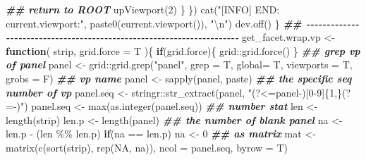 \documentclass[
]{article}
\newenvironment{Shaded}{\begin{snugshade}}{\end{snugshade}}
\newcommand{\AttributeTok}[1]{\textcolor[rgb]{0.77,0.63,0.00}{#1}}
\newcommand{\ConstantTok}[1]{\textcolor[rgb]{0.00,0.00,0.00}{#1}}
\newcommand{\ControlFlowTok}[1]{\textcolor[rgb]{0.13,0.29,0.53}{\textbf{#1}}}
\newcommand{\DecValTok}[1]{\textcolor[rgb]{0.00,0.00,0.81}{#1}}
\newcommand{\DocumentationTok}[1]{\textcolor[rgb]{0.56,0.35,0.01}{\textbf{\textit{#1}}}}
\newcommand{\FunctionTok}[1]{\textcolor[rgb]{0.00,0.00,0.00}{#1}}
\newcommand{\NormalTok}[1]{#1}
\newcommand{\OtherTok}[1]{\textcolor[rgb]{0.56,0.35,0.01}{#1}}
\newcommand{\SpecialCharTok}[1]{\textcolor[rgb]{0.00,0.00,0.00}{#1}}
\newcommand{\StringTok}[1]{\textcolor[rgb]{0.31,0.60,0.02}{#1}}
\begin{document}
\begin{Shaded}
\begin{Highlighting}[]
              \DocumentationTok{\#\# return to ROOT}
              \FunctionTok{upViewport}\NormalTok{(}\DecValTok{2}\NormalTok{)}
\NormalTok{            \}}
\NormalTok{            \})}
    \FunctionTok{cat}\NormalTok{(}\StringTok{"[INFO] END: current.viewport:"}\NormalTok{, }\FunctionTok{paste0}\NormalTok{(}\FunctionTok{current.viewport}\NormalTok{()), }\StringTok{"}\SpecialCharTok{\textbackslash{}n}\StringTok{"}\NormalTok{)}
    \FunctionTok{dev.off}\NormalTok{()}
\NormalTok{  \}}
\DocumentationTok{\#\# {-}{-}{-}{-}{-}{-}{-}{-}{-}{-}{-}{-}{-}{-}{-}{-}{-}{-}{-}{-}{-}{-}{-}{-}{-}{-}{-}{-}{-}{-}{-}{-}{-}{-}{-}{-}{-}{-}{-}{-}{-}{-}{-}{-}{-}{-}{-}{-}{-}{-}{-}{-}{-}{-}{-}{-}{-}{-}{-}{-}{-}{-}{-}{-}{-}{-}{-}{-}{-}{-} }
\NormalTok{get\_facet.wrap.vp }\OtherTok{\textless{}{-}}
  \ControlFlowTok{function}\NormalTok{(}
\NormalTok{           strip,}
           \AttributeTok{grid.force =}\NormalTok{ T}
\NormalTok{           )\{}
    \ControlFlowTok{if}\NormalTok{(grid.force)\{}
\NormalTok{      grid}\SpecialCharTok{::}\FunctionTok{grid.force}\NormalTok{()}
\NormalTok{    \}}
    \DocumentationTok{\#\# grep vp of panel}
\NormalTok{    panel }\OtherTok{\textless{}{-}}\NormalTok{ grid}\SpecialCharTok{::}\FunctionTok{grid.grep}\NormalTok{(}\StringTok{"panel"}\NormalTok{, }\AttributeTok{grep =}\NormalTok{ T, }\AttributeTok{global=}\NormalTok{ T, }\AttributeTok{viewports =}\NormalTok{ T, }\AttributeTok{grobs =}\NormalTok{ F)}
    \DocumentationTok{\#\# vp name}
\NormalTok{    panel }\OtherTok{\textless{}{-}} \FunctionTok{sapply}\NormalTok{(panel, paste)}
    \DocumentationTok{\#\# the specific seq number of vp}
\NormalTok{    panel.seq }\OtherTok{\textless{}{-}}\NormalTok{ stringr}\SpecialCharTok{::}\FunctionTok{str\_extract}\NormalTok{(panel, }\StringTok{"(?\textless{}=panel{-})[0{-}9]\{1,\}(?={-})"}\NormalTok{)}
\NormalTok{    panel.seq }\OtherTok{\textless{}{-}} \FunctionTok{max}\NormalTok{(}\FunctionTok{as.integer}\NormalTok{(panel.seq))}
    \DocumentationTok{\#\# number stat}
\NormalTok{    len }\OtherTok{\textless{}{-}} \FunctionTok{length}\NormalTok{(strip)}
\NormalTok{    len.p }\OtherTok{\textless{}{-}} \FunctionTok{length}\NormalTok{(panel)}
    \DocumentationTok{\#\# the number of blank panel}
\NormalTok{    na }\OtherTok{\textless{}{-}}\NormalTok{ len.p }\SpecialCharTok{{-}}\NormalTok{ (len }\SpecialCharTok{\%\%}\NormalTok{ len.p)}
    \ControlFlowTok{if}\NormalTok{(na }\SpecialCharTok{==}\NormalTok{ len.p)}
\NormalTok{      na }\OtherTok{\textless{}{-}} \DecValTok{0}
    \DocumentationTok{\#\# as matrix}
\NormalTok{    mat }\OtherTok{\textless{}{-}} \FunctionTok{matrix}\NormalTok{(}\FunctionTok{c}\NormalTok{(}\FunctionTok{sort}\NormalTok{(strip), }\FunctionTok{rep}\NormalTok{(}\ConstantTok{NA}\NormalTok{, na)), }\AttributeTok{ncol =}\NormalTok{ panel.seq, }\AttributeTok{byrow =}\NormalTok{ T)}

\end{Highlighting}
\end{Shaded}
\end{document}
